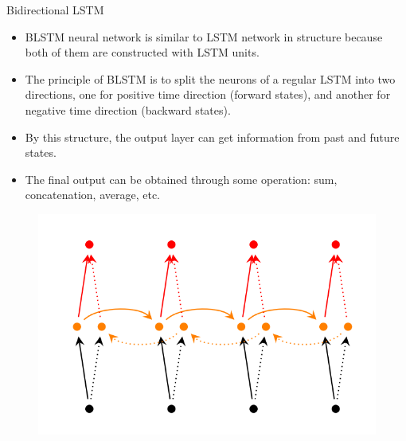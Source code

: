 \documentclass{beamer}
\begin{document}
\begin{frame}{Bidirectional LSTM}
	\begin{itemize}
		\item BLSTM neural network is similar to LSTM network in structure because both of them are constructed with LSTM units. 
		\item The principle of BLSTM is to split the neurons of a regular LSTM into two directions, one for positive time direction (forward states), and another for negative time direction (backward states).
		\item By this structure, the output layer can get information from past and future states.
		\item The final output can be obtained through some operation: sum, concatenation, average, etc.
	\end{itemize}
	\begin{figure}[htbp]
		\includegraphics[scale=0.5]{images/bidirectional-rnn}
	\end{figure}
\end{frame}
\end{document}
